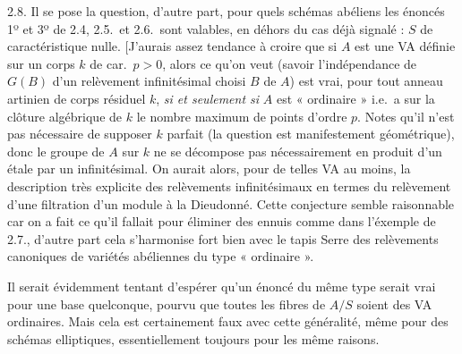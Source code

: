 \documentclass[11pt,a4paper]{article}
\begin{document}
2.8. Il se pose la question, d'autre part, pour quels schémas abéliens les
énoncés 1º et 3º de 2.4, 2.5.\ et 2.6.\ sont valables, en déhors
du cas déjà signalé : $S$ de caractéristique nulle. [J'aurais assez tendance à
croire que si $A$ est une VA définie sur un corps $k$ de car.\ $p>0$, alors ce
qu'on veut (savoir l'indépendance de $G(B)$ d'un relèvement infinitésimal
choisi $B$ de $A$) est vrai, pour tout anneau artinien de corps résiduel $k$,
\emph{si et seulement si} $A$ est « ordinaire » i.e.\ a sur la clôture
algébrique de $k$ le nombre maximum de points d'ordre $p$. Notes qu'il n'est pas nécessaire
de supposer $k$ parfait (la question est manifestement géométrique), donc le
groupe   de $A$ sur $k$ ne se décompose pas
nécessairement en produit d'un étale par un infinitésimal. On
aurait alors, pour de telles VA au moins, la description très explicite des
relèvements infinitésimaux en termes du relèvement d'une filtration d'un module
à la Dieudonné. Cette conjecture semble raisonnable car on a fait ce qu'il
fallait pour éliminer des ennuis comme dans l'éxemple de 2.7., d'autre
part cela s'harmonise fort bien avec le tapis Serre des relèvements canoniques
 de variétés abéliennes du type
« ordinaire ».\marginal{\ill{}}

Il serait évidemment tentant d'espérer qu'un énoncé du même type serait vrai
pour une base quelconque, pourvu que toutes les fibres de $A/S$ soient des VA
ordinaires. Mais cela est certainement faux avec cette généralité, même pour
des schémas elliptiques, essentiellement toujours pour les même raisons.
\end{document}
